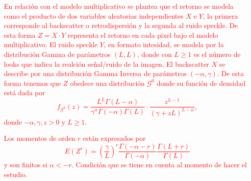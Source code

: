 \documentclass[11pt]{article}
\begin{document}


\textcolor{red}{En  relación con el modelo multiplicativo se plantea que el retorno se modela como el producto de dos variables aleatorias independientes $X$ e $Y$, la primera corresponde al backscatter o retrodispersión y la segunda al ruido speckle. De esta forma $Z=X\cdot Y$ representa el retorno en cada pixel bajo el modelo multiplicativo.
El ruido speckle $Y$, en formato intesidad, se modela por la distribución Gamma de parámetros $(L,L)$, donde con $L\geq 1$ es el número de looks que indica la realción señal/ruido de la imagen. El backscatter $X$ se describe por una distribución Gamma Inversa de parámetros $(-\alpha ,\gamma)$. De esta forma tenemos que $Z$ obedece una distribución $\mathcal G^0$ donde su función de densidad está dada por
\begin{equation*}
f_{\mathcal{G}^{0}}( z) =\frac{L^{L}\Gamma ( L-\alpha
	) }{\gamma ^{\alpha }\Gamma ( -\alpha ) \Gamma (
	L) }\cdot  
\frac{z^{L-1}}{( \gamma +zL) ^{L-\alpha }},%
\label{ec_dens_gI0}
\end{equation*}
donde $-\alpha,\gamma ,z>0$ y $L\geq 1$.
}

\textcolor{red}{
Los momentos de orden $r$ están expresados por
\begin{equation*}
E\left(Z^{r}\right)=\left(\frac{\gamma}{L}\right)^{r} \frac{\Gamma(-\alpha-r)}{\Gamma(-\alpha)} \frac{\Gamma(L+r)}{\Gamma(L)}
\end{equation*}
y son finitos si $\alpha<-r$. Condición que se tiene en cuenta al momento de hacer el estudio.
}
\end{document}
